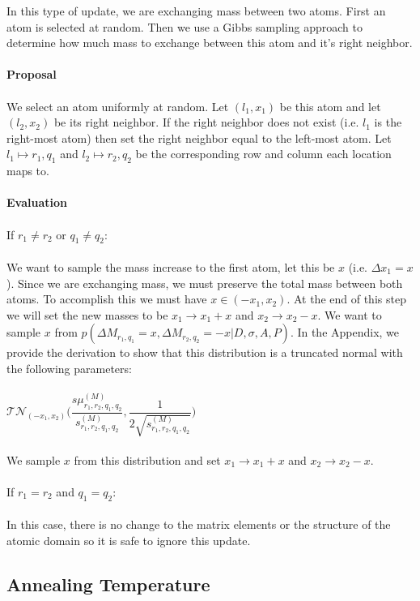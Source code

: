\documentclass[]{article}
\begin{document}
In this type of update, we are exchanging mass between two atoms. First an atom is selected at random. Then we use a Gibbs sampling approach to determine how much mass to exchange between this atom and it's right neighbor.\\
\\
\textbf{Proposal}\\
\\
We select an atom uniformly at random. Let $(l_1, x_1)$ be this atom and let $(l_2, x_2)$ be its right neighbor. If the right neighbor does not exist (i.e. $l_1$ is the right-most atom) then set the right neighbor equal to the left-most atom. Let $l_1 \mapsto r_1, q_1$ and $l_2 \mapsto r_2, q_2$ be the corresponding row and column each location maps to.\\
\\
\textbf{Evaluation}\\
\\
If $r_1 \neq r_2$ or $q_1 \neq q_2$:\\
\\
We want to sample the mass increase to the first atom, let this be $x$ (i.e. $\Delta x_1 = x$). Since we are exchanging mass, we must preserve the total mass between both atoms. To accomplish this we must have $x \in (-x_1, x_2)$. At the end of this step we will set the new masses to be $x_1 \rightarrow x_1 + x$ and $x_2 \rightarrow x_2 - x$. We want to sample $x$ from $p(\Delta M_{r_1,q_1} = x, \Delta M_{r_2,q_2} = -x | D, \sigma, A, P)$.  In the Appendix, we provide the derivation to show that this distribution is a truncated normal with the following parameters:\\
\\
$\mathcal{TN}_{(-x_1, x_2)}\biggr(\dfrac{ s\mu_{r_1,r_2,q_1,q_2}^{(M)}}{s_{r_1,r_2,q_1,q_2}^{(M)}}, \dfrac{1}{2\sqrt{s_{r_1,r_2,q_1,q_2}^{(M)}}}\biggr)$\\
\\
We sample $x$ from this distribution and set $x_1 \rightarrow x_1 + x$ and $x_2 \rightarrow x_2 - x$.\\
\\
If $r_1 = r_2$ and $q_1 = q_2$:\\
\\
In this case, there is no change to the matrix elements or the structure of the atomic domain so it is safe to ignore this update.

\subsection{Annealing Temperature}
\end{document}
